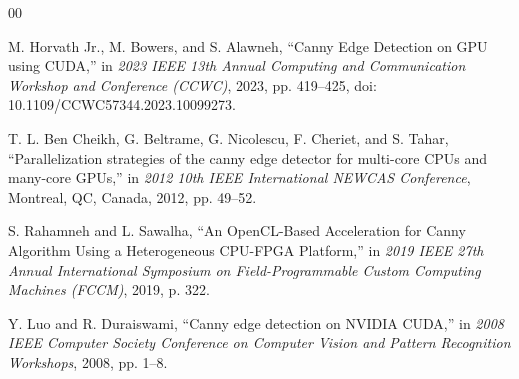 \documentclass[conference]{IEEEtran}
\begin{document}
\begin{thebibliography}{00}

M. Horvath Jr., M. Bowers, and S. Alawneh,
``Canny Edge Detection on GPU using CUDA,''
in \emph{2023 IEEE 13th Annual Computing and Communication Workshop and
Conference (CCWC)}, 2023, pp. 419--425,
doi: 10.1109/CCWC57344.2023.10099273.

T. L. Ben Cheikh, G. Beltrame, G. Nicolescu, F. Cheriet, and S. Tahar,
``Parallelization strategies of the canny edge detector for multi-core CPUs
and many-core GPUs,''
in \emph{2012 10th IEEE International NEWCAS Conference},
Montreal, QC, Canada, 2012, pp. 49--52.

S. Rahamneh and L. Sawalha,
``An OpenCL-Based Acceleration for Canny Algorithm Using a Heterogeneous
CPU-FPGA Platform,''
in \emph{2019 IEEE 27th Annual International Symposium on Field-Programmable
Custom Computing Machines (FCCM)}, 2019, p. 322.

Y. Luo and R. Duraiswami,
``Canny edge detection on NVIDIA CUDA,''
in \emph{2008 IEEE Computer Society Conference on Computer Vision and
Pattern Recognition Workshops}, 2008, pp. 1--8.

\end{thebibliography}
\end{document}
